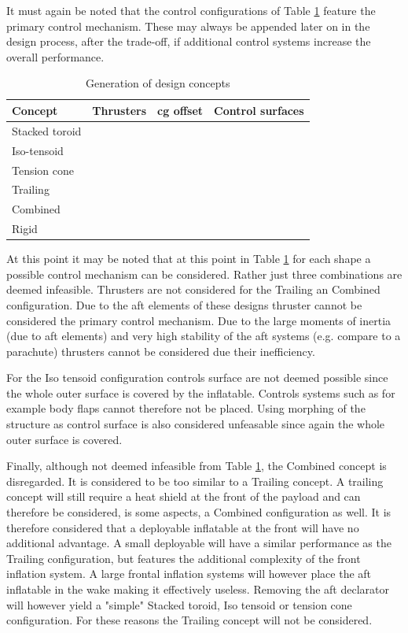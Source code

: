 It must again be noted that the control configurations of Table \ref{tab:designconcepts} feature the primary control mechanism. These may always be appended later on in the design process, after the trade-off, if additional control systems increase the overall performance. 

\begin{table}[H]
	\caption{Generation of design concepts}
	\label{tab:designconcepts}
	\centering
		\begin{tabular}{|p{}|p{}|p{}|p{}|} \hline 
			\textbf{Concept} & \textbf{Thrusters}	& \textbf{\gls{cg} offset} &  \textbf{Control surfaces} \\ \hline \hline
			Stacked toroid   & \cmark	& \cmark &  \cmark \\ \hline
			Iso-tensoid		 & \cmark	& \cmark &  \xmark\\ \hline
			Tension cone	 & \cmark	& \cmark &  \cmark \\ \hline
			Trailing 		 & \xmark	& \cmark &  \cmark \\ \hline
			Combined 		 & \xmark	& \cmark &  \cmark \\ \hline
			Rigid  		   	 & \cmark	& \cmark &  \cmark \\ \hline
		\end{tabular}
\end{table}

At this point it may be noted that at this point in Table \ref{tab:designconcepts} for each shape a possible control mechanism can be considered. Rather just three combinations are deemed infeasible. Thrusters are not considered for the Trailing an Combined configuration. Due to the aft elements of these designs thruster cannot be considered the primary control mechanism. Due to the large moments of inertia (due to aft elements) and very high stability of the aft systems (e.g. compare to a parachute) thrusters cannot be considered due their inefficiency. 

For the Iso tensoid configuration controls surface are not deemed possible since the whole outer surface is covered by the inflatable. Controls systems such as for example body flaps cannot therefore not be placed. Using morphing of the structure as control surface is also considered unfeasable since again the whole outer surface is covered. 

Finally, although not deemed infeasible from Table \ref{tab:designconcepts}, the Combined concept is disregarded. It is considered to be too similar to a Trailing concept. A trailing concept will still require a heat shield at the front of the payload and can therefore be considered, is some aspects, a Combined configuration as well. It is therefore considered that a deployable inflatable at the front will have no additional advantage. A small deployable will have a similar performance as the Trailing configuration, but features the additional complexity of the front inflation system. A large frontal inflation systems will however place the aft inflatable in the wake making it effectively useless. Removing the aft declarator will however yield a "simple" Stacked toroid, Iso tensoid or tension cone configuration. For these reasons the Trailing concept will not be considered. 


